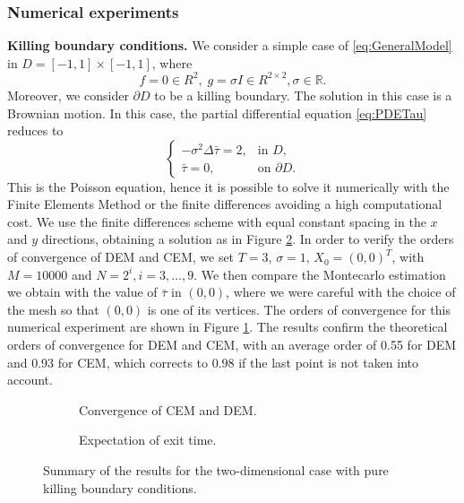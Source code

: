\subsubsection{Numerical experiments}

\textbf{Killing boundary conditions.} We consider a simple case of \eqref{eq:GeneralModel} in $D = [-1,1] \times [-1,1]$, where
\begin{equation*}
	f = 0 \in R^2, \; g = \sigma I\in R^{2\times 2}, \sigma \in \mathbb{R}.
\end{equation*}
Moreover, we consider $\partial D$ to be a killing boundary. The solution in this case is a Brownian motion. In this case, the partial differential equation \eqref{eq:PDETau} reduces to
\begin{equation}\label{eq:PDETau2DKilling}
\begin{cases}
	- \sigma^2 \Delta \bar \tau = 2, & \text{in } D, \\
	\bar \tau = 0, & \text{on } \partial D.
\end{cases}
\end{equation}
This is the Poisson equation, hence it is possible to solve it numerically with the Finite Elements Method or the finite differences avoiding a high computational cost. We use the finite differences scheme with equal constant spacing in the $x$ and $y$ directions, obtaining a solution as in Figure \ref{fig:TauExact2DKill}. In order to verify the orders of convergence of DEM and CEM, we set $T = 3$, $\sigma = 1$, $X_0 = (0,0)^T$, with $M = 10000$ and $N = 2^i,i=3,\dots,9$. We then compare the Montecarlo estimation we obtain with the value of $\bar\tau$ in $(0,0)$, where we were careful with the choice of the mesh so that $(0,0)$ is one of its vertices. The orders of convergence for this numerical experiment are shown in Figure \ref{fig:KillTwoD}. The results confirm the theoretical orders of convergence for DEM and CEM, with an average order of 0.55 for DEM and 0.93 for CEM, which corrects to 0.98 if the last point is not taken into account.

\begin{figure}[t]
    \centering
    \begin{subfigure}{0.49\linewidth}
        \centering
        \resizebox{1\linewidth}{!}{ }  
        \caption{Convergence of CEM and DEM.}
        \label{fig:KillTwoD}
    \end{subfigure}
    \begin{subfigure}{0.49\linewidth}
        \centering
        \resizebox{1\linewidth}{!}{ }  
        \caption{Expectation of exit time.}
        \label{fig:TauExact2DKill}
    \end{subfigure}    
    \caption{Summary of the results for the two-dimensional case with pure killing boundary conditions.}
    \label{fig:OrdersTwoDKill}
\end{figure}

